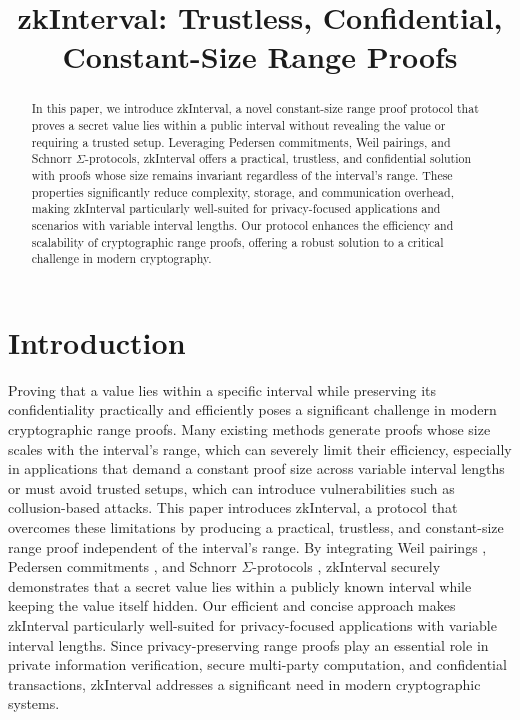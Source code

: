 \documentclass{iacrcc}
\title[running  = {zkInterval},
      ]{zkInterval: Trustless, Confidential, Constant-Size Range Proofs}
\begin{document}
\maketitle

\begin{abstract}
  In this paper, we introduce zkInterval, a novel constant-size range proof protocol that proves a secret value lies within a public interval without revealing the value or requiring a trusted setup. Leveraging Pedersen commitments, Weil pairings, and Schnorr $\Sigma$-protocols, zkInterval offers a practical, trustless, and confidential solution with proofs whose size remains invariant regardless of the interval's range. These properties significantly reduce complexity, storage, and communication overhead, making zkInterval particularly well-suited for privacy-focused applications and scenarios with variable interval lengths. Our protocol enhances the efficiency and scalability of cryptographic range proofs, offering a robust solution to a critical challenge in modern cryptography.
\end{abstract}

\begin{textabstract}
\end{textabstract}

\section{Introduction}

Proving that a value lies within a specific interval while preserving its confidentiality practically and efficiently poses a significant challenge in modern cryptographic range proofs. Many existing methods generate proofs whose size scales with the interval's range, which can severely limit their efficiency, especially in applications that demand a constant proof size across variable interval lengths or must avoid trusted setups, which can introduce vulnerabilities such as collusion-based attacks. This paper introduces zkInterval, a protocol that overcomes these limitations by producing a practical, trustless, and constant-size range proof independent of the interval's range. By integrating Weil pairings \cite[pp.62--63]{menezes1993}, Pedersen commitments \cite{pedersen1991}, and Schnorr $\Sigma$-protocols \cite[pp.310--311]{thaler2022}, zkInterval securely demonstrates that a secret value lies within a publicly known interval while keeping the value itself hidden. Our efficient and concise approach makes zkInterval particularly well-suited for privacy-focused applications with variable interval lengths. Since privacy-preserving range proofs play an essential role in private information verification, secure multi-party computation, and confidential transactions, zkInterval addresses a significant need in modern cryptographic systems.
\end{document}
